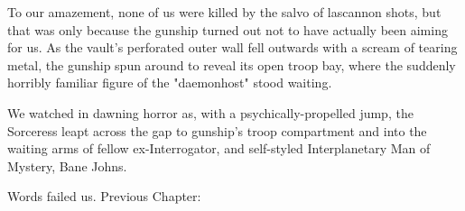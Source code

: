 To our amazement, none of us were killed by the salvo of lascannon shots, but that was only because the gunship turned out not to have actually been aiming for us. 
As the vault's perforated outer wall fell outwards with a scream of tearing metal, the gunship spun around to reveal its open troop bay, where the suddenly horribly familiar figure of the "daemonhost" stood waiting. 


We watched in dawning horror as, with a psychically-propelled jump, the Sorceress leapt across the gap to gunship's troop compartment and into the waiting arms of fellow ex-Interrogator, and self-styled Interplanetary Man of Mystery, Bane Johns.

Words failed us.
Previous Chapter: